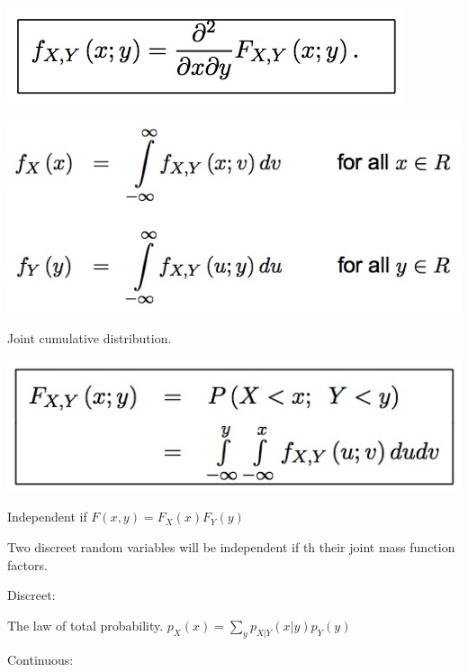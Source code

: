 \documentclass{examnotes}
\begin{document}
{\includegraphics[scale=0.4]{./img/3con2.jpg}                                         

\includegraphics[scale=0.4]{./img/3con3.jpg}                                         


Joint cumulative distribution.

\includegraphics[scale=0.4]{./img/3con4.jpg}                                         


{\Large {}}

{\Large {}}



Independent if $F(x,y)=F_X(x)F_Y(y)$

Two discreet random variables will be independent if th their joint mass function factors.


Discreet:

The law of total probability. $p_X(x)=\displaystyle\sum_y{p_{X|Y}(x|y)p_Y(y)}$

Continuous:

}
\end{document}
